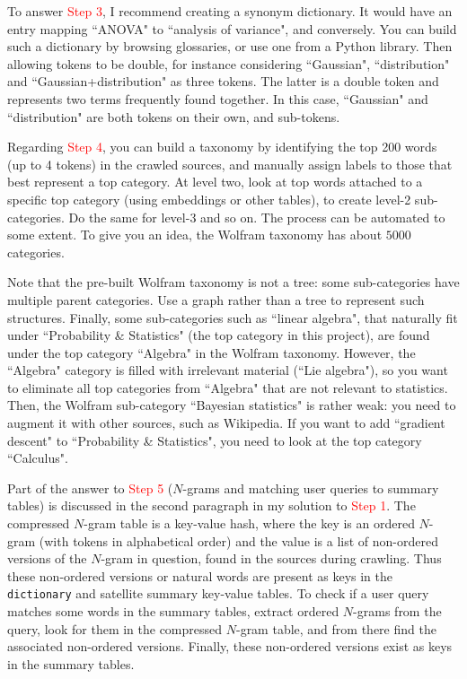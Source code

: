 \documentclass[oneside,10pt]{book}
\begin{document}
To answer \textcolor{red}{Step 3}, I recommend creating a synonym dictionary. It would have an entry mapping ``ANOVA" to ``analysis of variance", and
 conversely. You can build such a dictionary by browsing glossaries, or use one from a Python library. Then allowing tokens to
 be double, for instance considering ``Gaussian", ``distribution" and ``Gaussian+distribution" as three tokens. The latter is a double token and represents two terms frequently found together. In this case, ``Gaussian" and ``distribution" are both tokens on their own, and sub-tokens. 
 
Regarding \textcolor{red}{Step 4}, you can build a taxonomy by identifying the top 200 words (up to 4 tokens) in the crawled sources, and manually assign labels to those that best represent a
 top category. At level two, look at top words attached to a specific top category (using embeddings or other tables), to create level-2 sub-categories. Do the same for level-3 and so on. The process can be
 automated to some extent. To give you an idea, the Wolfram taxonomy has about $\num{5000}$ categories. 

Note that the pre-built Wolfram taxonomy is not a tree: some sub-categories have multiple parent categories. Use a graph rather than a tree
 to represent such structures. Finally, some sub-categories such as ``linear algebra", that naturally fit under ``Probability \& Statistics" (the top category in this project), are found under the top category ``Algebra" in the Wolfram taxonomy. However, the ``Algebra" category is filled with irrelevant material (``Lie algebra"), so you want to eliminate all top categories from ``Algebra" that are not relevant to statistics. Then, the Wolfram sub-category ``Bayesian statistics" is rather weak: you need to augment it with other sources, such as Wikipedia. If you want to add ``gradient descent" to ``Probability \& Statistics", you need to look at the top category ``Calculus". 

Part of the answer to \textcolor{red}{Step 5} ($N$-grams and matching user queries to summary tables) is discussed in the second paragraph in my solution to \textcolor{red}{Step 1}. The compressed $N$-gram table is a key-value hash, where the key is an ordered $N$-gram (with tokens in alphabetical order)
and the value is a list of non-ordered versions of the $N$-gram in question,  found in the sources during crawling. Thus these non-ordered versions or natural words 
 are present as keys in the \texttt{dictionary} and satellite summary key-value tables.  To check if a user query matches some words in the summary tables, 
extract ordered $N$-grams from the query, look for them in the compressed $N$-gram table, and from there find the associated non-ordered versions. Finally, these
 non-ordered versions exist as keys in the summary tables.
\end{document}
